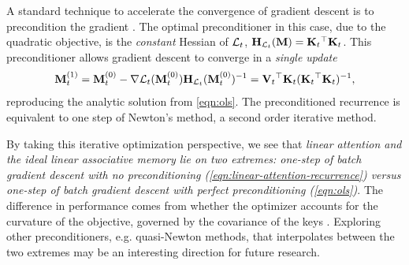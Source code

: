\documentclass[notitlepage, 11pt]{article}
\begin{document}
A standard technique to accelerate the convergence of gradient descent is to precondition the gradient \citep{Boyd2004ConvexOptimization}.
The optimal preconditioner in this case, due to the quadratic objective, is the \emph{constant} Hessian of $\mathcal{L}_t$, $\mathbf{H}_{\mathcal{L}_t}(\mathbf{M})=\mathbf{K}_t{}^\top\mathbf{K}_t$.
This preconditioner allows gradient descent to converge in a \emph{single update}
\begin{align}
    \mathbf{M}^{(1)}_t = \mathbf{M}^{(0)}_t - \nabla \mathcal{L}_t(\mathbf{M}^{(0)}_t)\mathbf{H}_{\mathcal{L}_t}(\mathbf{M}^{(0)}_t)^{-1} = \mathbf{V}_t{}^\top\mathbf{K}_t(\mathbf{K}_t{}^\top\mathbf{K}_t)^{-1},
\end{align}
reproducing the analytic solution from \autoref{eqn:ols}.
The preconditioned recurrence is equivalent to one step of Newton's method, a second order iterative method.

By taking this iterative optimization perspective, we see that \emph{linear attention and the ideal linear associative memory lie on two extremes: one-step of batch gradient descent with no preconditioning (\autoref{eqn:linear-attention-recurrence}) versus one-step of batch gradient descent with perfect preconditioning (\autoref{eqn:ols})}.
The difference in performance comes from whether the optimizer accounts for the curvature of the objective, governed by the covariance of the keys \citep{Boyd2004ConvexOptimization}.
Exploring other preconditioners, e.g. quasi-Newton methods, that interpolates between the two extremes may be an interesting direction for future research.
\end{document}
